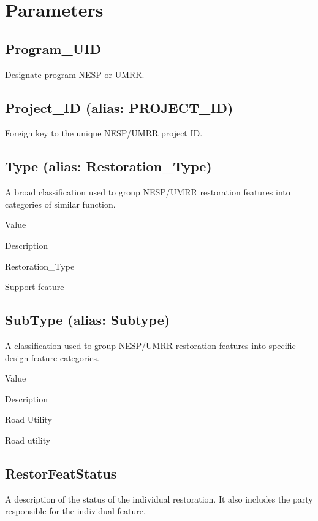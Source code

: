 \documentclass[
  letterpaper,
  DIV=11,
  numbers=noendperiod]{scrreprt}
\begin{document}
\section{Parameters}\label{parameters-23}

\subsection{Program\_UID}\label{program_uid-23}

Designate program NESP or UMRR.

\subsection{Project\_ID (alias:
PROJECT\_ID)}\label{project_id-alias-project_id-23}

Foreign key to the unique NESP/UMRR project ID.

\subsection{Type (alias:
Restoration\_Type)}\label{type-alias-restoration_type-4}

A broad classification used to group NESP/UMRR restoration features into
categories of similar function.

Value

Description

Restoration\_Type

Support feature

\subsection{SubType (alias: Subtype)}\label{subtype-alias-subtype-23}

A classification used to group NESP/UMRR restoration features into
specific design feature categories.

Value

Description

Road Utility

Road utility

\subsection{RestorFeatStatus}\label{restorfeatstatus-23}

A description of the status of the individual restoration. It also
includes the party responsible for the individual feature.
\end{document}
